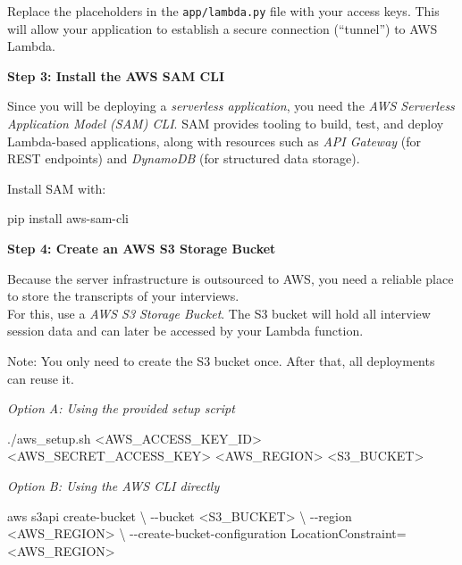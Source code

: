 \documentclass[
  letterpaper,
  DIV=11,
  numbers=noendperiod]{scrartcl}
\newenvironment{Shaded}{\begin{snugshade}}{\end{snugshade}}
\newcommand{\AttributeTok}[1]{\textcolor[rgb]{0.40,0.45,0.13}{#1}}
\newcommand{\DataTypeTok}[1]{\textcolor[rgb]{0.68,0.00,0.00}{#1}}
\newcommand{\ExtensionTok}[1]{\textcolor[rgb]{0.00,0.23,0.31}{#1}}
\newcommand{\NormalTok}[1]{\textcolor[rgb]{0.00,0.23,0.31}{#1}}
\newcommand{\OperatorTok}[1]{\textcolor[rgb]{0.37,0.37,0.37}{#1}}
\begin{document}
Replace the placeholders in the \texttt{app/lambda.py} file with your
access keys. This will allow your application to establish a secure
connection (``tunnel'') to AWS Lambda.

\textbf{Step 3: Install the AWS SAM CLI}

Since you will be deploying a \emph{serverless application}, you need
the \emph{AWS Serverless Application Model (SAM) CLI}. SAM provides
tooling to build, test, and deploy Lambda-based applications, along with
resources such as \emph{API Gateway} (for REST endpoints) and
\emph{DynamoDB} (for structured data storage).

Install SAM with:

\begin{Shaded}
\begin{Highlighting}[]
\ExtensionTok{pip}\NormalTok{ install aws{-}sam{-}cli}
\end{Highlighting}
\end{Shaded}

\textbf{Step 4: Create an AWS S3 Storage Bucket}

Because the server infrastructure is outsourced to AWS, you need a
reliable place to store the transcripts of your interviews.\\
For this, use a \emph{AWS S3 Storage Bucket}. The S3 bucket will hold
all interview session data and can later be accessed by your Lambda
function.

Note: You only need to create the S3 bucket once. After that, all
deployments can reuse it.

\emph{Option A: Using the provided setup script}

\begin{Shaded}
\begin{Highlighting}[]
\ExtensionTok{./aws\_setup.sh} \OperatorTok{\textless{}}\NormalTok{AWS\_ACCESS\_KEY\_ID}\OperatorTok{\textgreater{}} \OperatorTok{\textless{}}\NormalTok{AWS\_SECRET\_ACCESS\_KEY}\OperatorTok{\textgreater{}} \OperatorTok{\textless{}}\NormalTok{AWS\_REGION}\OperatorTok{\textgreater{}} \OperatorTok{\textless{}}\NormalTok{S3\_BUCKET}\OperatorTok{\textgreater{}}
\end{Highlighting}
\end{Shaded}

\emph{Option B: Using the AWS CLI directly}

\begin{Shaded}
\begin{Highlighting}[]
\ExtensionTok{aws}\NormalTok{ s3api create{-}bucket }\DataTypeTok{\textbackslash{}}
  \AttributeTok{{-}{-}bucket} \OperatorTok{\textless{}}\NormalTok{S3\_BUCKET}\OperatorTok{\textgreater{}} \DataTypeTok{\textbackslash{}}
  \AttributeTok{{-}{-}region} \OperatorTok{\textless{}}\NormalTok{AWS\_REGION}\OperatorTok{\textgreater{}} \DataTypeTok{\textbackslash{}}
  \AttributeTok{{-}{-}create{-}bucket{-}configuration}\NormalTok{ LocationConstraint=}\OperatorTok{\textless{}}\NormalTok{AWS\_REGION}\OperatorTok{\textgreater{}}
\end{Highlighting}
\end{Shaded}
\end{document}
